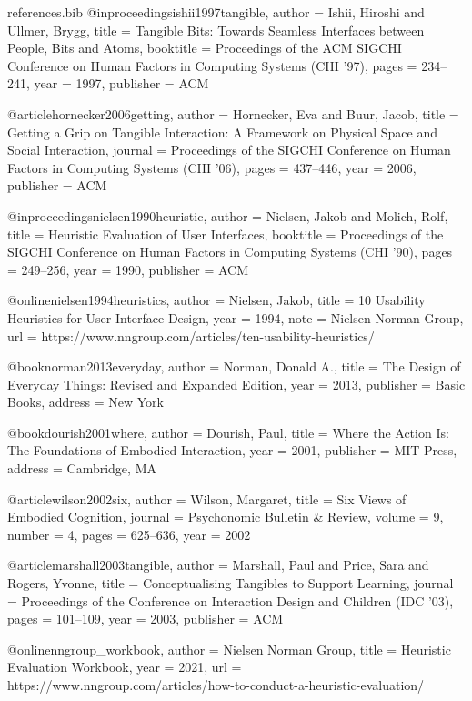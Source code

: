 \begin{filecontents}[overwrite]{references.bib}
@inproceedings{ishii1997tangible,
  author    = {Ishii, Hiroshi and Ullmer, Brygg},
  title     = {Tangible Bits: Towards Seamless Interfaces between People,
               Bits and Atoms},
  booktitle = {Proceedings of the ACM SIGCHI Conference on Human Factors
               in Computing Systems (CHI '97)},
  pages     = {234--241},
  year      = {1997},
  publisher = {ACM}
}

@article{hornecker2006getting,
  author  = {Hornecker, Eva and Buur, Jacob},
  title   = {Getting a Grip on Tangible Interaction: A Framework on Physical
             Space and Social Interaction},
  journal = {Proceedings of the SIGCHI Conference on Human Factors in
             Computing Systems (CHI '06)},
  pages   = {437--446},
  year    = {2006},
  publisher = {ACM}
}

@inproceedings{nielsen1990heuristic,
  author    = {Nielsen, Jakob and Molich, Rolf},
  title     = {Heuristic Evaluation of User Interfaces},
  booktitle = {Proceedings of the SIGCHI Conference on Human Factors in
               Computing Systems (CHI '90)},
  pages     = {249--256},
  year      = {1990},
  publisher = {ACM}
}

@online{nielsen1994heuristics,
  author  = {Nielsen, Jakob},
  title   = {10 Usability Heuristics for User Interface Design},
  year    = {1994},
  note    = {Nielsen Norman Group},
  url     = {https://www.nngroup.com/articles/ten-usability-heuristics/}
}

@book{norman2013everyday,
  author    = {Norman, Donald A.},
  title     = {The Design of Everyday Things: Revised and Expanded Edition},
  year      = {2013},
  publisher = {Basic Books},
  address   = {New York}
}

@book{dourish2001where,
  author    = {Dourish, Paul},
  title     = {Where the Action Is: The Foundations of Embodied Interaction},
  year      = {2001},
  publisher = {MIT Press},
  address   = {Cambridge, MA}
}

@article{wilson2002six,
  author  = {Wilson, Margaret},
  title   = {Six Views of Embodied Cognition},
  journal = {Psychonomic Bulletin \& Review},
  volume  = {9},
  number  = {4},
  pages   = {625--636},
  year    = {2002}
}

@article{marshall2003tangible,
  author  = {Marshall, Paul and Price, Sara and Rogers, Yvonne},
  title   = {Conceptualising Tangibles to Support Learning},
  journal = {Proceedings of the Conference on Interaction Design and Children (IDC '03)},
  pages   = {101--109},
  year    = {2003},
  publisher = {ACM}
}

@online{nngroup_workbook,
  author = {{Nielsen Norman Group}},
  title  = {Heuristic Evaluation Workbook},
  year   = {2021},
  url    = {https://www.nngroup.com/articles/how-to-conduct-a-heuristic-evaluation/}
}
\end{filecontents}

